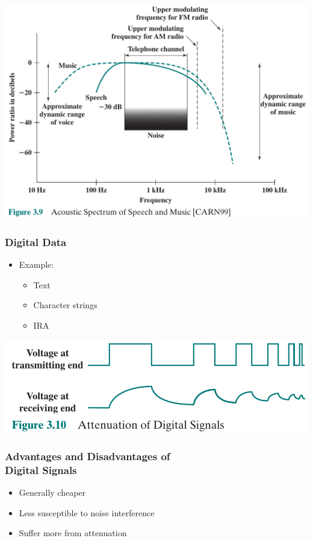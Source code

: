 \documentclass[pdflatex,compress]{beamer}
\begin{document}
\begin{frame}
	\begin{center}
		\includegraphics[height=0.8\textheight]{img/img08}
	\end{center}
\end{frame}

\begin{frame}
	\frametitle{Digital Data}
	\begin{itemize}
		\item Example:
		\begin{itemize}
			\item Text
			\item Character strings
			\item IRA
		\end{itemize}
	\end{itemize}
\end{frame}

\begin{frame}
	\begin{center}
		\includegraphics[width=\linewidth]{img/img09}
	\end{center}
\end{frame}

\begin{frame}
	\frametitle{Advantages and Disadvantages of\\Digital Signals}
	\begin{itemize}
		\item Generally cheaper
		\item Less susceptible to noise interference
		\item Suffer more from attenuation
	\end{itemize}
\end{frame}
\end{document}

